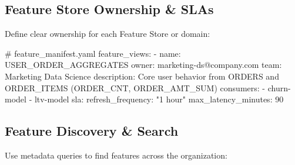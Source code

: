 \documentclass[
  letterpaper,
  DIV=11,
  numbers=noendperiod]{scrreprt}
\newenvironment{Shaded}{\begin{snugshade}}{\end{snugshade}}
\newcommand{\AttributeTok}[1]{\textcolor[rgb]{0.40,0.45,0.13}{#1}}
\newcommand{\CommentTok}[1]{\textcolor[rgb]{0.37,0.37,0.37}{#1}}
\newcommand{\DecValTok}[1]{\textcolor[rgb]{0.68,0.00,0.00}{#1}}
\newcommand{\FunctionTok}[1]{\textcolor[rgb]{0.28,0.35,0.67}{#1}}
\newcommand{\KeywordTok}[1]{\textcolor[rgb]{0.00,0.23,0.31}{#1}}
\newcommand{\StringTok}[1]{\textcolor[rgb]{0.13,0.47,0.30}{#1}}
\begin{document}
\hypertarget{feature-store-ownership-slas}{%
\subsection{Feature Store Ownership \&
SLAs}\label{feature-store-ownership-slas}}

Define clear ownership for each Feature Store or domain:

\begin{Shaded}
\begin{Highlighting}[]
\CommentTok{\# feature\_manifest.yaml}
\FunctionTok{feature\_views}\KeywordTok{:}
\AttributeTok{  }\KeywordTok{{-}}\AttributeTok{ }\FunctionTok{name}\KeywordTok{:}\AttributeTok{ USER\_ORDER\_AGGREGATES}
\AttributeTok{    }\FunctionTok{owner}\KeywordTok{:}\AttributeTok{ marketing{-}ds@company.com}
\AttributeTok{    }\FunctionTok{team}\KeywordTok{:}\AttributeTok{ Marketing Data Science}
\AttributeTok{    }\FunctionTok{description}\KeywordTok{:}\AttributeTok{ Core user behavior from ORDERS and ORDER\_ITEMS (ORDER\_CNT, ORDER\_AMT\_SUM)}
\AttributeTok{    }\FunctionTok{consumers}\KeywordTok{:}
\AttributeTok{      }\KeywordTok{{-}}\AttributeTok{ churn{-}model}
\AttributeTok{      }\KeywordTok{{-}}\AttributeTok{ ltv{-}model}
\AttributeTok{    }\FunctionTok{sla}\KeywordTok{:}
\AttributeTok{      }\FunctionTok{refresh\_frequency}\KeywordTok{:}\AttributeTok{ }\StringTok{"1 hour"}
\AttributeTok{      }\FunctionTok{max\_latency\_minutes}\KeywordTok{:}\AttributeTok{ }\DecValTok{90}
\end{Highlighting}
\end{Shaded}

\hypertarget{feature-discovery-search}{%
\subsection{Feature Discovery \&
Search}\label{feature-discovery-search}}

Use metadata queries to find features across the organization:
\end{document}
